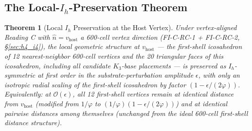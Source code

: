 \documentclass[11pt,letterpaper]{article}
\newtheorem{theorem}{Theorem}[section]
\newcommand{\phig}{\varphi}
\newcommand{\Kthree}{\ensuremath{K_3}}
\begin{document}
\subsection{The Local-$I_h$-Preservation Theorem}\label{sec:local_ih_preservation_theorem}

\begin{theorem}[Local $I_h$ Preservation at the Host Vertex]\label{thm:local_ih_preservation}
Under vertex-aligned Reading C with $\hat{n} = v_{\text{host}}$ a 600-cell vertex direction (FI-C-RC-1 + FI-C-RC-2, \S\ref{sec:h4_i4}), the local geometric structure at $v_{\text{host}}$ --- the first-shell icosahedron of 12 nearest-neighbor 600-cell vertices and the 20 triangular faces of this icosahedron, including all candidate $\Kthree$-base placements --- is preserved as $I_h$-symmetric at first order in the substrate-perturbation amplitude $\epsilon$, with only an isotropic radial scaling of the first-shell icosahedron by factor $(1 - \epsilon/(2\phig))$. Equivalently: at $\mathcal{O}(\epsilon)$, all 12 first-shell vertices remain at identical distance from $v_{\text{host}}$ (modified from $1/\phig$ to $(1/\phig)(1 - \epsilon/(2\phig))$) and at identical pairwise distances among themselves (unchanged from the ideal 600-cell first-shell distance structure).
\end{theorem}
\end{document}
